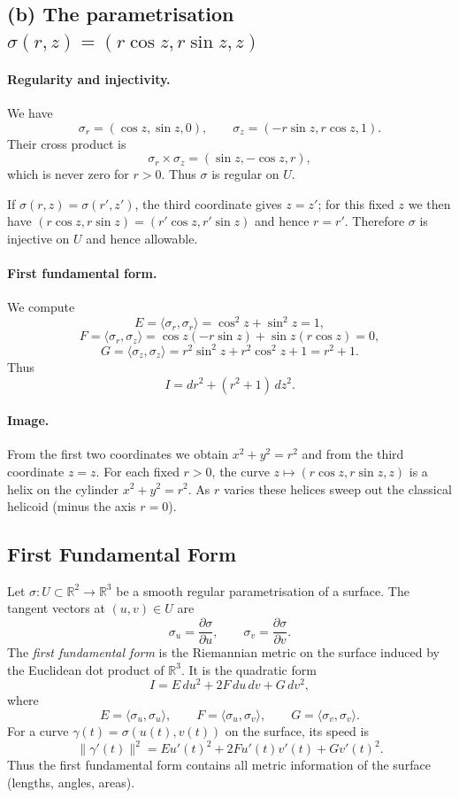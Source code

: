 \documentclass[12pt,a4paper]{article}
\theoremstyle{plain}
\theoremstyle{definition}      %
\begin{document}
	\subsection*{(b) The parametrisation $\sigma(r,z)=(r\cos z,r\sin z,z)$}
	
	\paragraph{Regularity and injectivity.}
	We have
	\[
	\sigma_r = (\cos z,\sin z,0),\qquad
	\sigma_z = (-r\sin z,r\cos z,1).
	\]
	Their cross product is
	\[
	\sigma_r\times\sigma_z
	= (\sin z,-\cos z,r),
	\]
	which is never zero for $r>0$.  Thus $\sigma$ is regular on $U$.
	
	If $\sigma(r,z)=\sigma(r',z')$, the third coordinate gives $z=z'$; for this
	fixed $z$ we then have $(r\cos z,r\sin z)=(r'\cos z,r'\sin z)$ and hence
	$r=r'$.  Therefore $\sigma$ is injective on $U$ and hence allowable.
	
	\paragraph{First fundamental form.}
	We compute
	\[
	E = \langle\sigma_r,\sigma_r\rangle
	= \cos^2 z + \sin^2 z = 1,
	\]
	\[
	F = \langle\sigma_r,\sigma_z\rangle
	= \cos z(-r\sin z) + \sin z(r\cos z) = 0,
	\]
	\[
	G = \langle\sigma_z,\sigma_z\rangle
	= r^2\sin^2 z + r^2\cos^2 z + 1 = r^2+1.
	\]
	Thus
	\[
	I = dr^2 + (r^2+1)\,dz^2.
	\]
	
	\paragraph{Image.}
	From the first two coordinates we obtain $x^2+y^2=r^2$ and from the third
	coordinate $z=z$.  For each fixed $r>0$, the curve $z\mapsto(r\cos z,r\sin z,z)$
	is a helix on the cylinder $x^2+y^2=r^2$.  As $r$ varies these helices sweep
	out the classical helicoid (minus the axis $r=0$).
	
	
	\subsection*{First Fundamental Form}
	
	Let $\sigma : U \subset \mathbb{R}^2 \to \mathbb{R}^3$ be a smooth regular
	parametrisation of a surface.  The tangent vectors at $(u,v)\in U$ are
	\[
	\sigma_u = \frac{\partial \sigma}{\partial u},
	\qquad
	\sigma_v = \frac{\partial \sigma}{\partial v}.
	\]
	The \emph{first fundamental form} is the Riemannian metric on the surface
	induced by the Euclidean dot product of $\mathbb{R}^3$.  It is the quadratic
	form
	\[
	I = E\,du^2 + 2F\,du\,dv + G\,dv^2,
	\]
	where
	\[
	E = \langle \sigma_u,\sigma_u\rangle, \qquad
	F = \langle \sigma_u,\sigma_v\rangle, \qquad
	G = \langle \sigma_v,\sigma_v\rangle.
	\]
	For a curve $\gamma(t)=\sigma(u(t),v(t))$ on the surface, its speed is
	\[
	\|\gamma'(t)\|^2
	= E u'(t)^2 + 2F u'(t)v'(t) + G v'(t)^2.
	\]
	Thus the first fundamental form contains all metric information of the
	surface (lengths, angles, areas).
	
\end{document}
